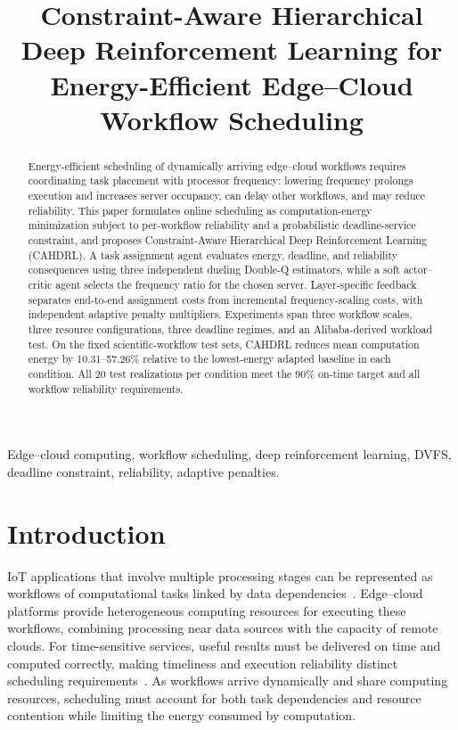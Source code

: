 \documentclass[journal]{IEEEtran}
\begin{document}
\title{Constraint-Aware Hierarchical Deep Reinforcement Learning for Energy-Efficient Edge--Cloud Workflow Scheduling}
\author{}
\maketitle
\begin{abstract}
Energy-efficient scheduling of dynamically arriving edge--cloud workflows requires coordinating task placement with processor frequency: lowering frequency prolongs execution and increases server occupancy, can delay other workflows, and may reduce reliability. This paper formulates online scheduling as computation-energy minimization subject to per-workflow reliability and a probabilistic deadline-service constraint, and proposes Constraint-Aware Hierarchical Deep Reinforcement Learning (CAHDRL). A task assignment agent evaluates energy, deadline, and reliability consequences using three independent dueling Double-Q estimators, while a soft actor--critic agent selects the frequency ratio for the chosen server. Layer-specific feedback separates end-to-end assignment costs from incremental frequency-scaling costs, with independent adaptive penalty multipliers. Experiments span three workflow scales, three resource configurations, three deadline regimes, and an Alibaba-derived workload test. On the fixed scientific-workflow test sets, CAHDRL reduces mean computation energy by 10.31--57.26\% relative to the lowest-energy adapted baseline in each condition. All 20 test realizations per condition meet the 90\% on-time target and all workflow reliability requirements.
\end{abstract}
\begin{IEEEkeywords}
Edge--cloud computing, workflow scheduling, deep reinforcement learning, DVFS, deadline constraint, reliability, adaptive penalties.
\end{IEEEkeywords}
\section{Introduction}
IoT applications that involve multiple processing stages can be represented as workflows of computational tasks linked by data dependencies~\cite{taghinezhad2025}. Edge--cloud platforms provide heterogeneous computing resources for executing these workflows, combining processing near data sources with the capacity of remote clouds. For time-sensitive services, useful results must be delivered on time and computed correctly, making timeliness and execution reliability distinct scheduling requirements~\cite{siyadatzadeh2023relief}. As workflows arrive dynamically and share computing resources, scheduling must account for both task dependencies and resource contention while limiting the energy consumed by computation.
\end{document}
